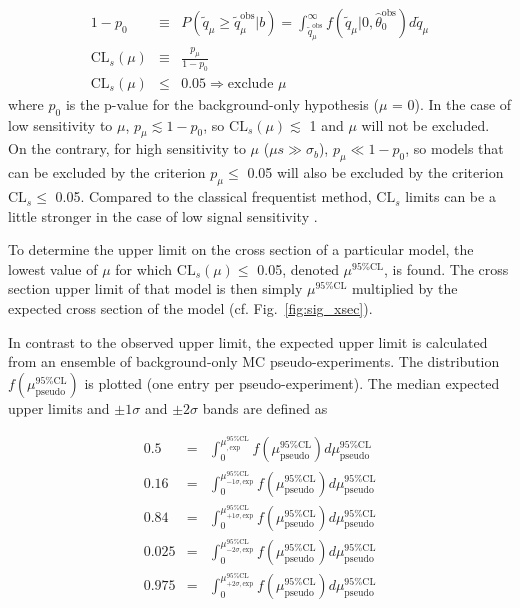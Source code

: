 \documentclass[dissertation.tex]{subfiles}
\begin{document}
\begin{eqnarray}
\label{eq:CLb_p_value}
1 - p_{0} &\equiv& P(\tilde{q}_{\mu} \geq \tilde{q}_{\mu}^{\mathrm{obs}} | b) = \int_{\tilde{q}_{\mu}^{\mathrm{obs}}}^{\infty} f(\tilde{q}_{\mu} | 0, \hat{\theta}_{0}^{\mathrm{obs}}) d\tilde{q}_{\mu} \\
\mbox{CL}_{s}(\mu) &\equiv& \frac{p_{\mu}}{1 - p_{0}} \\
\mbox{CL}_{s}(\mu) &\leq& 0.05 \Rightarrow \mbox{exclude }\mu \nonumber
\end{eqnarray}
%
where $p_{0}$ is the p-value for the background-only hypothesis ($\mu$ = 0).  In the case of low sensitivity to $\mu$, $p_{\mu} \lesssim 1 - p_{0}$, so $\mbox{CL}_{s}(\mu) \lesssim$ 1 and $\mu$ will not be excluded.  On the contrary, for high sensitivity to $\mu$ ($\mu s \gg \sigma_{b}$), $p_{\mu} \ll 1 - p_{0}$, so models that can be excluded by the criterion $p_{\mu} \leq$ 0.05 will also be excluded by the criterion $\mbox{CL}_{s} \leq$ 0.05.  Compared to the classical frequentist method, $\mbox{CL}_{s}$ limits can be a little stronger in the case of low signal sensitivity \cite{ATLAS:1379837}.

To determine the upper limit on the cross section of a particular model, the lowest value of $\mu$ for which $\mbox{CL}_{s}(\mu) \leq$ 0.05, denoted $\mu^{95\%\mathrm{CL}}$, is found.  The cross section upper limit of that model is then simply $\mu^{95\%\mathrm{CL}}$ multiplied by the expected cross section of the model (cf. Fig.~\ref{fig:sig_xsec}).

In contrast to the observed upper limit, the expected upper limit is calculated from an ensemble of background-only MC pseudo-experiments.  The distribution $f(\mu^{95\%\mathrm{CL}}_{\mathrm{pseudo}})$ is plotted (one entry per pseudo-experiment).  The median expected upper limits and $\pm1\sigma$ and $\pm2\sigma$ bands are defined as 

\begin{eqnarray}
\label{eq:exp_limits}
0.5 &=& \int_{0}^{\mu^{95\%\mathrm{CL}}_{\mathrm{,exp}}} f(\mu^{95\%\mathrm{CL}}_{\mathrm{pseudo}})d\mu^{95\%\mathrm{CL}}_{\mathrm{pseudo}} \\
0.16 &=& \int_{0}^{\mu^{95\%\mathrm{CL}}_{-1\sigma\mathrm{,exp}}} f(\mu^{95\%\mathrm{CL}}_{\mathrm{pseudo}})d\mu^{95\%\mathrm{CL}}_{\mathrm{pseudo}} \\
0.84 &=& \int_{0}^{\mu^{95\%\mathrm{CL}}_{+1\sigma\mathrm{,exp}}} f(\mu^{95\%\mathrm{CL}}_{\mathrm{pseudo}})d\mu^{95\%\mathrm{CL}}_{\mathrm{pseudo}} \\
0.025 &=& \int_{0}^{\mu^{95\%\mathrm{CL}}_{-2\sigma\mathrm{,exp}}} f(\mu^{95\%\mathrm{CL}}_{\mathrm{pseudo}})d\mu^{95\%\mathrm{CL}}_{\mathrm{pseudo}} \\
0.975 &=& \int_{0}^{\mu^{95\%\mathrm{CL}}_{+2\sigma\mathrm{,exp}}} f(\mu^{95\%\mathrm{CL}}_{\mathrm{pseudo}})d\mu^{95\%\mathrm{CL}}_{\mathrm{pseudo}}
\end{eqnarray}
\end{document}
